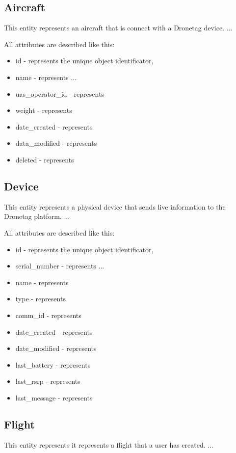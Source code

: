 \subsection{Aircraft}\label{subsec:aircraft}
This entity represents an aircraft that is connect with a Dronetag device.
...

All attributes are described like this:
\begin{itemize}
    \item id - represents the unique object identificator,
    \item name - represents ...
    \item uas\_operator\_id - represents
    \item weight - represents
    \item date\_created - represents
    \item data\_modified - represents
    \item deleted - represents
\end{itemize}

\subsection{Device}\label{subsec:device}
This entity represents a physical device that sends live information to the Dronetag platform.
...

All attributes are described like this:
\begin{itemize}
    \item id - represents the unique object identificator,
    \item serial\_number - represents ...
    \item name - represents
    \item type - represents
    \item comm\_id - represents
    \item date\_created - represents
    \item date\_modified - represents
    \item last\_battery - represents
    \item last\_rsrp - represents
    \item last\_message - represents
\end{itemize}

\subsection{Flight}\label{subsec:flight}
This entity represents it represents a flight that a user has created.
...

